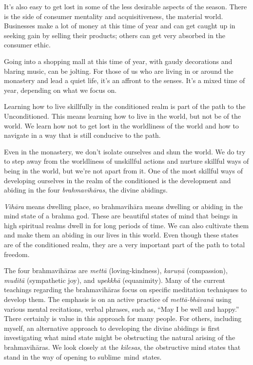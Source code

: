 It's also easy to get lost in some of the less desirable aspects of the season. There is the side of consumer mentality and acquisitiveness, the material world. Businesses make a lot of money at this time of year and can get caught up in seeking gain by selling their products; others can get very absorbed in the consumer ethic.

Going into a shopping mall at this time of year, with gaudy decorations and blaring music, can be jolting. For those of us who are living in or around the monastery and lead a quiet life, it's an affront to the senses. It's a mixed time of year, depending on what we focus on.

Learning how to live skillfully in the conditioned realm is part of the path to the Unconditioned. This means learning how to live in the world, but not be of the world. We learn how not to get lost in the worldliness of the world and how to navigate in a way that is still conducive to the path.

Even in the monastery, we don't isolate ourselves and shun the world. We do try to step away from the worldliness of unskillful actions and nurture skillful ways of being in the world, but we're not apart from it. One of the most skillful ways of developing ourselves in the realm of the conditioned is the development and abiding in the four \emph{brahmavihāras}, the divine abidings.

\emph{Vihāra} means dwelling place, so brahmavihāra means dwelling or abiding in the mind state of a brahma god. These are beautiful states of mind that beings in high spiritual realms dwell in for long periods of time. We can also cultivate them and make them an abiding in our lives in this world. Even though these states are of the conditioned realm, they are a very important part of the path to total freedom.

The four brahmavihāras are \emph{mettā} (loving-kindness), \emph{karuṇā} (compassion), \emph{muditā} (sympathetic joy), and \emph{upekkhā} (equanimity). Many of the current teachings regarding the brahmavihāras focus on specific meditation techniques to develop them. The emphasis is on an active practice of \emph{mettā-bhāvanā} using various mental recitations, verbal phrases, such as, ``May I be well and happy.'' There certainly is value in this approach for many people. For others, including myself, an alternative approach to developing the divine abidings is first investigating what mind state might be obstructing the natural arising of the brahmavihāras. We look closely at the \emph{kilesas}, the obstructive mind states that stand in the way of opening to \mbox{sublime mind states.}

